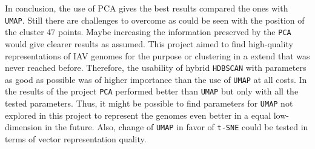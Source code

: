\vspace{1em}

In conclusion, the use of PCA gives the best results compared the ones with \texttt{UMAP}. Still there are challenges to overcome as could be seen with the position of the cluster 47 points. Maybe increasing the information preserved by the \texttt{PCA} would give clearer results as assumed. This project aimed to find high-quality representations of \gls{IAV} genomes for the purpose or clustering in a extend that was never reached before. Therefore, the usability of hybrid \texttt{HDBSCAN} with parameters as good as possible was of higher importance than the use of \texttt{UMAP} at all costs. In the results of the project \texttt{PCA} performed better than \texttt{UMAP} but only with all the tested parameters. Thus, it might be possible to find parameters for \texttt{UMAP} not explored in this project to represent the genomes even better in a equal low-dimension in the future. Also, change of \texttt{UMAP} in favor of \texttt{t-SNE} could be tested in terms of vector representation quality.